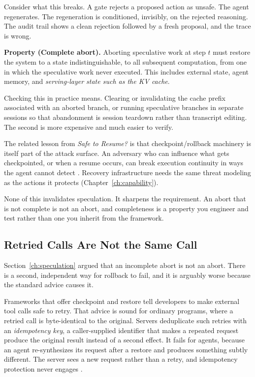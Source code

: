 Consider what this breaks. A gate rejects a proposed action as unsafe. The agent
regenerates. The regeneration is conditioned, invisibly, on the rejected
reasoning. The audit trail shows a clean rejection followed by a fresh proposal,
and the trace is wrong.

\textbf{Property (Complete abort).} Aborting speculative work at step $t$ must
restore the system to a state indistinguishable, to all subsequent computation,
from one in which the speculative work never executed. This includes external
state, agent memory, and \emph{serving-layer state such as the KV cache}.

Checking this in practice means. Clearing or invalidating the cache prefix
associated with an aborted branch, or running speculative branches in separate
sessions so that abandonment is session teardown rather than transcript editing.
The second is more expensive and much easier to verify.

The related lesson from \emph{Safe to Resume?} is that checkpoint/rollback
machinery is itself part of the attack surface. An adversary who can influence
what gets checkpointed, or when a resume occurs, can break execution continuity
in ways the agent cannot detect \cite{saferesume2026}. Recovery infrastructure
needs the same threat modeling as the actions it protects
(Chapter~\ref{ch:capability}).

None of this invalidates speculation. It sharpens the requirement. An abort that
is not complete is not an abort, and completeness is a property you engineer and
test rather than one you inherit from the framework.

\subsection{Retried Calls Are Not the Same Call}

Section~\ref{ch:speculation} argued that an incomplete abort is not an abort.
There is a second, independent way for rollback to fail, and it is arguably worse
because the standard advice causes it.

Frameworks that offer checkpoint and restore tell developers to make external
tool calls safe to retry. That advice is sound for ordinary programs, where a retried call is byte-identical to the original. Servers deduplicate such retries with an \emph{idempotency key}, a caller-supplied identifier that makes a repeated request produce the original result instead of a second effect. It fails for agents, because an agent re-synthesizes its request
after a restore and produces something subtly different. The server sees a new
request rather than a retry, and idempotency protection never engages
\cite{acrfence2026}.

